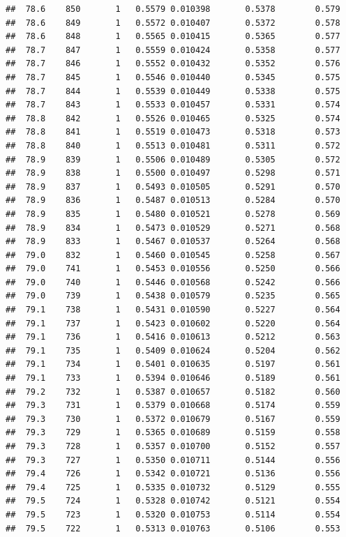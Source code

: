 \documentclass[
]{book}
\begin{document}
\begin{verbatim}
##  78.6    850       1   0.5579 0.010398       0.5378        0.579
##  78.6    849       1   0.5572 0.010407       0.5372        0.578
##  78.6    848       1   0.5565 0.010415       0.5365        0.577
##  78.7    847       1   0.5559 0.010424       0.5358        0.577
##  78.7    846       1   0.5552 0.010432       0.5352        0.576
##  78.7    845       1   0.5546 0.010440       0.5345        0.575
##  78.7    844       1   0.5539 0.010449       0.5338        0.575
##  78.7    843       1   0.5533 0.010457       0.5331        0.574
##  78.8    842       1   0.5526 0.010465       0.5325        0.574
##  78.8    841       1   0.5519 0.010473       0.5318        0.573
##  78.8    840       1   0.5513 0.010481       0.5311        0.572
##  78.9    839       1   0.5506 0.010489       0.5305        0.572
##  78.9    838       1   0.5500 0.010497       0.5298        0.571
##  78.9    837       1   0.5493 0.010505       0.5291        0.570
##  78.9    836       1   0.5487 0.010513       0.5284        0.570
##  78.9    835       1   0.5480 0.010521       0.5278        0.569
##  78.9    834       1   0.5473 0.010529       0.5271        0.568
##  78.9    833       1   0.5467 0.010537       0.5264        0.568
##  79.0    832       1   0.5460 0.010545       0.5258        0.567
##  79.0    741       1   0.5453 0.010556       0.5250        0.566
##  79.0    740       1   0.5446 0.010568       0.5242        0.566
##  79.0    739       1   0.5438 0.010579       0.5235        0.565
##  79.1    738       1   0.5431 0.010590       0.5227        0.564
##  79.1    737       1   0.5423 0.010602       0.5220        0.564
##  79.1    736       1   0.5416 0.010613       0.5212        0.563
##  79.1    735       1   0.5409 0.010624       0.5204        0.562
##  79.1    734       1   0.5401 0.010635       0.5197        0.561
##  79.1    733       1   0.5394 0.010646       0.5189        0.561
##  79.2    732       1   0.5387 0.010657       0.5182        0.560
##  79.3    731       1   0.5379 0.010668       0.5174        0.559
##  79.3    730       1   0.5372 0.010679       0.5167        0.559
##  79.3    729       1   0.5365 0.010689       0.5159        0.558
##  79.3    728       1   0.5357 0.010700       0.5152        0.557
##  79.3    727       1   0.5350 0.010711       0.5144        0.556
##  79.4    726       1   0.5342 0.010721       0.5136        0.556
##  79.4    725       1   0.5335 0.010732       0.5129        0.555
##  79.5    724       1   0.5328 0.010742       0.5121        0.554
##  79.5    723       1   0.5320 0.010753       0.5114        0.554
##  79.5    722       1   0.5313 0.010763       0.5106        0.553

\end{verbatim}
\end{document}
